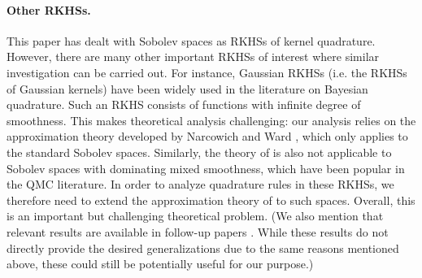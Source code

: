 \documentclass[11pt]{article}
\theoremstyle{remark}
\theoremstyle{example}
\theoremstyle{remark}
\newcommand{\blue}{\textcolor{blue}}
\begin{document}
\paragraph{Other RKHSs.}
This paper has dealt with Sobolev spaces as RKHSs of kernel quadrature.
However, there are many other important RKHSs of interest where similar investigation can be carried out. 
For instance, Gaussian RKHSs (i.e. the RKHSs of Gaussian kernels) have been widely used in the literature on Bayesian quadrature.
Such an RKHS consists of functions with infinite degree of smoothness.
This makes theoretical analysis challenging: our analysis relies on the approximation theory developed by Narcowich and Ward \cite{NarWar04}, which only applies to the standard Sobolev spaces.
Similarly, the theory of \cite{NarWar04} is also not applicable to Sobolev spaces with dominating mixed smoothness, which have been popular in the QMC literature. 
In order to analyze quadrature rules in these RKHSs, we therefore need to extend the approximation theory of \cite{NarWar04} to such spaces. 
Overall, this is an important but challenging theoretical problem.
(We also mention that relevant results are available in follow-up papers \cite{NarWarWen05,NarWarWen06}.
While these results do not directly provide the desired generalizations due to the same reasons mentioned above, these could still be potentially useful for our purpose.)\vspace{-4mm}
\end{document}
